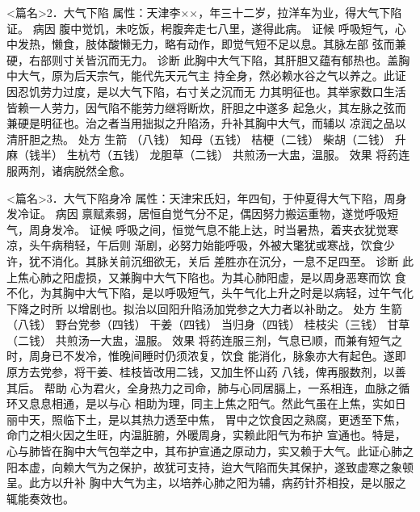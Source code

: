 \documentclass[a4paper,12pt,UTF8,twoside]{ctexbook}
\begin{document}
<篇名>2．大气下陷
属性：天津李××，年三十二岁，拉洋车为业，得大气下陷证。 
病因 腹中觉饥，未吃饭，枵腹奔走七八里，遂得此病。 
证候 呼吸短气，心中发热，懒食，肢体酸懒无力，略有动作，即觉气短不足以息。其脉左部 
弦而兼硬，右部则寸关皆沉而无力。 
诊断 此胸中大气下陷，其肝胆又蕴有郁热也。盖胸中大气，原为后天宗气，能代先天元气主 
持全身，然必赖水谷之气以养之。此证因忍饥劳力过度，是以大气下陷，右寸关之沉而无 
力其明征也。其举家数口生活皆赖一人劳力，因气陷不能劳力继将断炊，肝胆之中遂多 
起急火，其左脉之弦而兼硬是明征也。治之者当用拙拟之升陷汤，升补其胸中大气，而辅以 
凉润之品以清肝胆之热。 
处方 生箭 （八钱） 知母（五钱） 桔梗（二钱） 柴胡（二钱） 
升麻（钱半） 生杭芍（五钱） 龙胆草（二钱） 
共煎汤一大盅，温服。 
效果 将药连服两剂，诸病脱然全愈。 


<篇名>3．大气下陷身冷
属性：天津宋氏妇，年四旬，于仲夏得大气下陷，周身发冷证。 
病因 禀赋素弱，居恒自觉气分不足，偶因努力搬运重物，遂觉呼吸短气，周身发冷。 
证候 呼吸之间，恒觉气息不能上达，时当暑热，着夹衣犹觉寒凉，头午病稍轻，午后则 
渐剧，必努力始能呼吸，外被大氅犹或寒战，饮食少许，犹不消化。其脉关前沉细欲无，关后 
差胜亦在沉分，一息不足四至。 
诊断 此上焦心肺之阳虚损，又兼胸中大气下陷也。为其心肺阳虚，是以周身恶寒而饮 
食不化，为其胸中大气下陷，是以呼吸短气，头午气化上升之时是以病轻，过午气化下降之时所 
以增剧也。拟治以回阳升陷汤加党参之大力者以补助之。 
处方 生箭 （八钱） 野台党参（四钱） 干姜（四钱） 当归身（四钱） 
桂枝尖（三钱） 甘草（二钱） 
共煎汤一大盅，温服。 
效果 将药连服三剂，气息已顺，而兼有短气之时，周身已不发冷，惟晚间睡时仍须浓复，饮食 
能消化，脉象亦大有起色。遂即原方去党参，将干姜、桂枝皆改用二钱，又加生怀山药 
八钱，俾再服数剂，以善其后。 
帮助 心为君火，全身热力之司命，肺与心同居膈上，一系相连，血脉之循环又息息相通，是以与心 
相助为理，同主上焦之阳气。然此气虽在上焦，实如日丽中天，照临下土，是以其热力透至中焦， 
胃中之饮食因之熟腐，更透至下焦，命门之相火因之生旺，内温脏腑，外暖周身，实赖此阳气为布护 
宣通也。特是，心与肺皆在胸中大气包举之中，其布护宣通之原动力，实又赖于大气。此证心肺之 
阳本虚，向赖大气为之保护，故犹可支持，迨大气陷而失其保护，遂致虚寒之象顿呈。此方以升补 
胸中大气为主，以培养心肺之阳为辅，病药针芥相投，是以服之辄能奏效也。 
\end{document}

